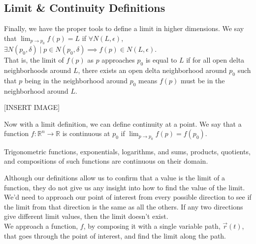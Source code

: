 \subsection{Limit \& Continuity Definitions}
\noindent
Finally, we have the proper tools to define a limit in higher dimensions. We say that $\lim_{p\to p_0}f(p) = L$ if $\forall N(L, \epsilon)$, $\exists N(p_0,\delta) \mid p \in N(p_0, \delta) \implies f(p) \in N(L, \epsilon)$.\\
That is, the limit of $f(p)$ as $p$ approaches $p_0$ is equal to $L$ if for all open delta neighborhoods around $L$, there exists an open delta neighborhood around $p_0$ such that $p$ being in the neighborhood around $p_0$ means $f(p)$ must be in the neighborhood around $L$.

[INSERT IMAGE]

\noindent
Now with a limit definition, we can define continuity at a point. We say that a function $f : \mathbb{R}^n \to \mathbb{R}$ is continuous at $p_0$ if $\lim_{p \to p_0}{f(p)} = f(p_0)$.\\

\noindent
\begin{theorem}
	Trigonometric functions, exponentials, logarithms, and sums, products, quotients, and compositions of such functions are continuous on their domain.
\end{theorem}

\noindent
Although our definitions allow us to confirm that a value is the limit of a function, they do not give us any insight into how to find the value of the limit. We'd need to approach our point of interest from every possible direction to see if the limit from that direction is the same as all the others. If any two directions give different limit values, then the limit doesn't exist.\\
We approach a function, $f$, by composing it with a single variable path, $\vec{r}(t)$, that goes through the point of interest, and find the limit along the path.\\

